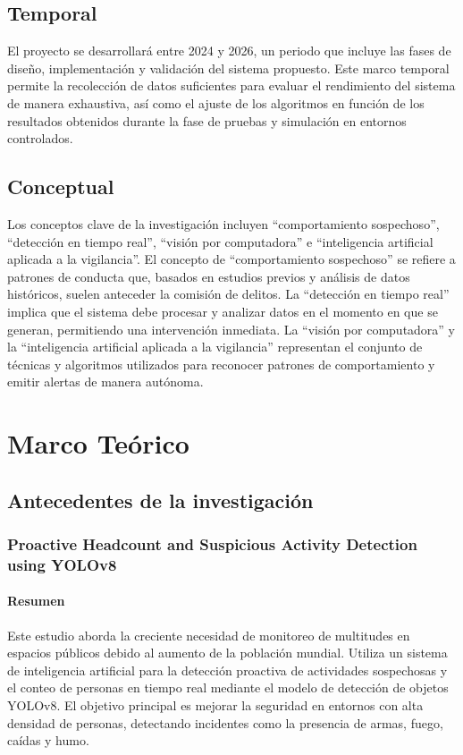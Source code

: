 \documentclass[listof=nochaptergap,12pt,times,authoryear]{report}
\begin{document}
\section{Temporal}
El proyecto se desarrollará entre 2024 y 2026, un periodo que incluye las fases de diseño, implementación y validación del sistema propuesto. Este marco temporal permite la recolección de datos suficientes para evaluar el rendimiento del sistema de manera exhaustiva, así como el ajuste de los algoritmos en función de los resultados obtenidos durante la fase de pruebas y simulación en entornos controlados.

\section{Conceptual}
Los conceptos clave de la investigación incluyen “comportamiento sospechoso”, “detección en tiempo real”, “visión por computadora” e “inteligencia artificial aplicada a la vigilancia”. El concepto de “comportamiento sospechoso” se refiere a patrones de conducta que, basados en estudios previos y análisis de datos históricos, suelen anteceder la comisión de delitos. La “detección en tiempo real” implica que el sistema debe procesar y analizar datos en el momento en que se generan, permitiendo una intervención inmediata. La “visión por computadora” y la “inteligencia artificial aplicada a la vigilancia” representan el conjunto de técnicas y algoritmos utilizados para reconocer patrones de comportamiento y emitir alertas de manera autónoma.


\chapter{Marco Teórico}

\section{Antecedentes de la investigación}

\subsection{Proactive Headcount and Suspicious Activity Detection using YOLOv8}

\subsubsection{Resumen}
Este estudio aborda la creciente necesidad de monitoreo de multitudes en espacios públicos debido al aumento de la población mundial. Utiliza un sistema de inteligencia artificial para la detección proactiva de actividades sospechosas y el conteo de personas en tiempo real mediante el modelo de detección de objetos YOLOv8. El objetivo principal es mejorar la seguridad en entornos con alta densidad de personas, detectando incidentes como la presencia de armas, fuego, caídas y humo.
\end{document}
